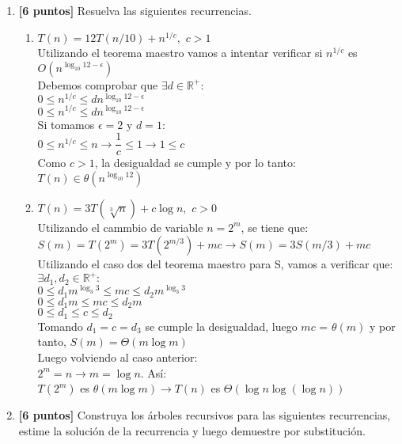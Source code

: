 \documentclass[10pt]{article}
\newcommand{\Ot}[1]{O\left(#1\right)}
\begin{document}
\begin{enumerate}
\item \textbf{[6 puntos]}  Resuelva las siguientes recurrencias.
\begin{enumerate}
  \item $T(n) = 12T\left(n/10\right) + n^{1/c},$ $c>1$\\
  Utilizando el teorema maestro vamos a intentar verificar si $n^{1/c}$ es $O(n^{\log_{10}{12-\epsilon}})$\\
  Debemos comprobar que
  $\exists d\in\mathbb{R^+}$:\\
  $0\leq n^{1/c}\leq dn^{\log_{10}{12-\epsilon}}$\\
  $0\leq n^{1/c}\leq dn^{\log_{10}{12-\epsilon}}$\\
  Si tomamos $\epsilon = 2$ y $d = 1$:\\
  $0\leq n^{1/c}\leq n\rightarrow\dfrac{1}{c}\leq 1\rightarrow1\leq c$\\
  Como $c>1$, la desigualdad se cumple y por lo tanto:\\
  $T(n) \in \theta(n^{\log_{10}{12}})$
  \item $T(n) = 3T\left(\sqrt[3]{n}\right) + c\log n,$ $c>0$\\
  Utilizando el cammbio de variable $n = 2^m$, se tiene que:\\
  $S(m)=T(2^m)=3T(2^{m/3})+mc\rightarrow S(m)=3S(m/3)+mc$
  Utilizando el caso dos del teorema maestro para S, vamos a verificar que:\\
  $\exists d_1,d_2\in\mathbb{R^+}:$\\$0\leq d_1m^{\log_3{3}} \leq mc\leq d_2m^{\log_3{3}}$\\$0\leq d_1m \leq mc\leq d_2m$\\$0\leq d_1 \leq c\leq d_2$\\
  Tomando $d_1=c=d_3$ se cumple la desigualdad, luego $mc$ = $\theta(m)$ y por tanto, $S(m) = \Theta(m\log m)$\\Luego volviendo al caso anterior:\\
  $2^m=n\rightarrow m=\log n$. Así:\\
  $T(2^m)$ es $\theta(m\log m)\rightarrow T(n)$ es $\Theta(\log n \log (\log n))$
\end{enumerate}

\item \textbf{[6 puntos]} Construya los árboles recursivos para las siguientes recurrencias, estime la solución de la recurrencia y luego demuestre por substitución.


\end{enumerate}
\end{document}
